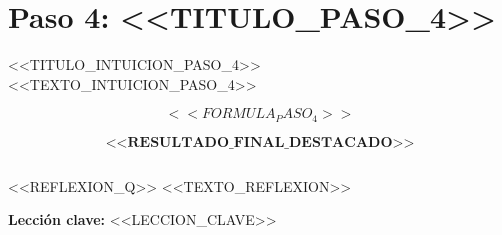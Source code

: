 \documentclass[12pt,a4paper]{article}
\begin{document}
\vspace{1cm}

\section{Paso 4: <<TITULO_PASO_4>>}

\begin{cajaintuicion}{<<TITULO_INTUICION_PASO_4>>}
<<TEXTO_INTUICION_PASO_4>>
\end{cajaintuicion}

\[
<<FORMULA_PASO_4>>
\]

\begin{tcolorbox}[colback=verdeclaro!80, colframe=green!40!black,
                  halign=center, boxsep=8pt]
\Large
\[
\boxed{\textbf{<<RESULTADO_FINAL_DESTACADO>>}}
\]
\end{tcolorbox}

\vspace{1cm}

\begin{cajaresultado}
\begin{center}
\large
\begin{tabular}{p{7cm}p{5.5cm}}
\end{tabular}
\end{center}
\end{cajaresultado}

\vspace{1cm}

\begin{cajareflexion}{<<REFLEXION_Q>>}
<<TEXTO_REFLEXION>>

\textbf{Lecci\'on clave:} <<LECCION_CLAVE>>
\end{cajareflexion}

\vspace{1cm}

\newpage
\end{document}

